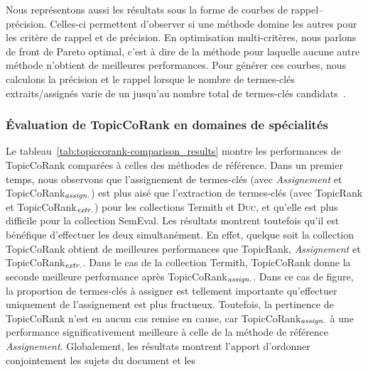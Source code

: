         Nous représentons aussi les résultats sous la forme de courbes de
        rappel--précision. Celles-ci permettent d'observer si une méthode domine
        les autres pour les critère de rappel et de précision. En optimisation
        multi-critères, nous parlons de front de Pareto optimal, c'est à dire de
        la méthode pour laquelle aucune autre méthode n'obtient de meilleures
        performances. Pour générer ces courbes, nous calculons la précision et
        le rappel lorsque  le nombre de termes-clés extraits/assignés varie de
        un jusqu'au nombre total de termes-clés
        candidats~\cite{hassan2010conundrums}.
      
      \subsubsection{Évaluation de TopicCoRank en domaines de spécialités}
      \label{subsubsec:main-domain_specific_keyphrase_annotation-supervised_automatic_keyphrase_annotation-evaluation-topiccorank_specific_domains}
        Le tableau~\ref{tab:topiccorank-comparison_results} montre les
        performances de TopicCoRank comparées à celles des méthodes de
        référence. Dans un premier temps, nous observons que l'assignement de
        termes-clés (avec \textit{Assignement} et
        TopicCoRank$_\textnormal{\textit{assign.}}$) est plus aisé que
        l'extraction de termes-clés (avec TopicRank et
        TopicCoRank$_\textnormal{\textit{extr.}}$) pour les collections Termith
        et \textsc{Duc}, et qu'elle est plus difficile pour la collection
        SemEval. Les résultats montrent toutefois qu'il est bénéfique
        d'effectuer les deux simultanément. En effet, quelque soit la collection
        TopicCoRank obtient de meilleures performances que TopicRank,
        \textit{Assignement} et TopicCoRank$_\textnormal{\textit{extr.}}$. Dans
        le cas de la collection Termith, TopicCoRank donne la seconde meilleure
        performance après TopicCoRank$_\textnormal{\textit{assign.}}$. Dans ce
        cas de figure, la proportion de termes-clés \og{}à assigner\fg{} est
        tellement importante qu'effectuer uniquement de l'assignement est plus
        fructueux. Toutefois, la pertinence de TopicCoRank n'est en aucun cas
        remise en cause, car TopicCoRank$_\textnormal{\textit{assign.}}$ à une
        performance significativement meilleure à celle de la méthode de
        référence \textit{Assignement}. Globalement, les résultats montrent
        l'apport d'ordonner conjointement les sujets du document et les
